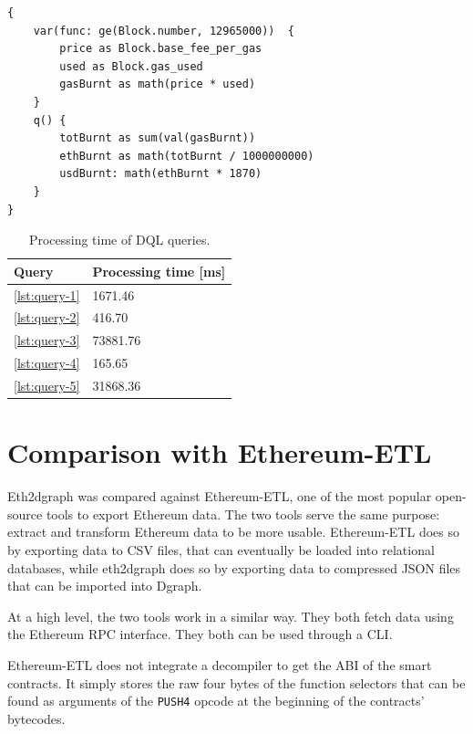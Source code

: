 \begin{lstlisting}[caption={Query to compute the ETH burnt after London upgrade.},label={lst:query-5},captionpos=b,numbers=none]
{
    var(func: ge(Block.number, 12965000))  {
        price as Block.base_fee_per_gas
        used as Block.gas_used
        gasBurnt as math(price * used)
    }
    q() {
        totBurnt as sum(val(gasBurnt))
        ethBurnt as math(totBurnt / 1000000000)
        usdBurnt: math(ethBurnt * 1870) 
    }
}
\end{lstlisting}

\begin{table}[H]
\centering
    \begin{threeparttable}
    \begin{tabular}{ m{3cm} m{5cm} } 
    \toprule
    \textbf{Query} & \textbf{Processing time [ms]}\\
    \midrule
    \cref{lst:query-1}   & 1671.46  \\ [1.2ex]
    \cref{lst:query-2}   & 416.70  \\ [1.2ex]
    \cref{lst:query-3}   & 73881.76  \\ [1.2ex]
    \cref{lst:query-4}   & 165.65  \\ [1.2ex]
    \cref{lst:query-5}   & 31868.36  \\ [1.2ex]
    \bottomrule
    \end{tabular}
    \end{threeparttable}
    \caption{Processing time of DQL queries. }
    \label{table:queries-results}
\end{table}
 
\section{Comparison with Ethereum-ETL}

Eth2dgraph was compared against Ethereum-ETL, one of the most popular open-source tools to export Ethereum data. The two tools serve the same purpose: extract and transform Ethereum data to be more usable.
Ethereum-ETL does so by exporting data to CSV files, that can eventually be loaded into relational databases, while eth2dgraph does so by exporting data to compressed JSON files that can be imported into Dgraph. 

At a high level, the two tools work in a similar way. They both fetch data using the Ethereum RPC interface. They both can be used through a CLI.

Ethereum-ETL does not integrate a decompiler to get the ABI of the smart contracts. It simply stores the raw four bytes of the function selectors that can be found as arguments of the {\tt PUSH4} opcode at the beginning of the contracts' bytecodes. 

